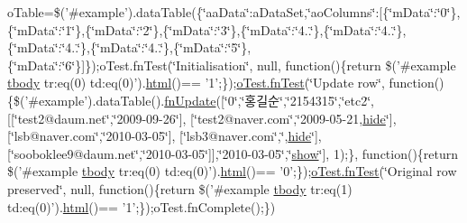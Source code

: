 \begin{DoxyCompactItemize}
o\+Table=\$('\#example').data\+Table(\{\char`\"{}aa\+Data\char`\"{}\+:a\+Data\+Set,\char`\"{}ao\+Columns\char`\"{}\+:\mbox{[}\{\char`\"{}m\+Data\char`\"{}\+:\char`\"{}0\char`\"{}\},\{\char`\"{}m\+Data\char`\"{}\+:\char`\"{}1\char`\"{}\},\{\char`\"{}m\+Data\char`\"{}\+:\char`\"{}2\char`\"{}\},\{\char`\"{}m\+Data\char`\"{}\+:\char`\"{}3\char`\"{}\},\{\char`\"{}m\+Data\char`\"{}\+:\char`\"{}4..\char`\"{}\},\{\char`\"{}m\+Data\char`\"{}\+:\char`\"{}4..\char`\"{}\},\{\char`\"{}m\+Data\char`\"{}\+:\char`\"{}4..\char`\"{}\},\{\char`\"{}m\+Data\char`\"{}\+:\char`\"{}4..\char`\"{}\},\{\char`\"{}m\+Data\char`\"{}\+:\char`\"{}5\char`\"{}\},\{\char`\"{}m\+Data\char`\"{}\+:\char`\"{}6\char`\"{}\}\mbox{]}\});o\+Test.\+fn\+Test(\char`\"{}Initialisation\char`\"{}, null, function()\{return \$('\#example \hyperlink{core_8constructor_8js_a99b0542c7c50fe8757c55bf9dac5f3be}{tbody} tr\+:eq(0) td\+:eq(0)').\hyperlink{tinymce_8jquery_8dev_8js_ac2090bcf2ff968c0083d5de53a6544f3}{html}()== '1';\});\hyperlink{__zero__config__objects__subarrays_8js_a7f100cfe8617a03cd30c47b5e15396a4}{o\+Test.\+fn\+Test}(\char`\"{}Update row\char`\"{}, function()\{\$('\#example').data\+Table().\hyperlink{api_8methods_8js_aa2d5cb6c218aa3c1618c97dc3c71a5a0}{fn\+Update}(\mbox{[}\char`\"{}0\char`\"{},\char`\"{}홍길순\char`\"{},\char`\"{}2154315\char`\"{},\char`\"{}etc2\char`\"{}, \mbox{[}\mbox{[}\char`\"{}test2@daum.\+net\char`\"{},\char`\"{}2009-\/09-\/26\char`\"{}\mbox{]}, \mbox{[}\char`\"{}test2@naver.\+com\char`\"{},\char`\"{}2009-\/05-\/21,\hyperlink{jquery_8tooltip_8js_af74dd80504a76d14389d6c8c02f3aa0e}{hide}\char`\"{}\mbox{]}, \mbox{[}\char`\"{}lsb@naver.\+com\char`\"{},\char`\"{}2010-\/03-\/05\char`\"{}\mbox{]}, \mbox{[}\char`\"{}lsb3@naver.\+com\char`\"{},\char`\"{},\hyperlink{jquery_8tooltip_8js_af74dd80504a76d14389d6c8c02f3aa0e}{hide}\char`\"{}\mbox{]}, \mbox{[}\char`\"{}sooboklee9@daum.\+net\char`\"{},\char`\"{}2010-\/03-\/05\char`\"{}\mbox{]}\mbox{]},\char`\"{}2010-\/03-\/05\char`\"{},\char`\"{}\hyperlink{jquery_8tooltip_8js_aa8d9f2083cafa2af98efafed94901079}{show}\char`\"{}\mbox{]}, 1);\}, function()\{return \$('\#example \hyperlink{core_8constructor_8js_a99b0542c7c50fe8757c55bf9dac5f3be}{tbody} tr\+:eq(0) td\+:eq(0)').\hyperlink{tinymce_8jquery_8dev_8js_ac2090bcf2ff968c0083d5de53a6544f3}{html}()== '0';\});\hyperlink{__zero__config__objects__subarrays_8js_a7f100cfe8617a03cd30c47b5e15396a4}{o\+Test.\+fn\+Test}(\char`\"{}Original row preserved\char`\"{}, null, function()\{return \$('\#example \hyperlink{core_8constructor_8js_a99b0542c7c50fe8757c55bf9dac5f3be}{tbody} tr\+:eq(1) td\+:eq(0)').\hyperlink{tinymce_8jquery_8dev_8js_ac2090bcf2ff968c0083d5de53a6544f3}{html}()== '1';\});o\+Test.\+fn\+Complete();\})
\end{DoxyCompactItemize}


